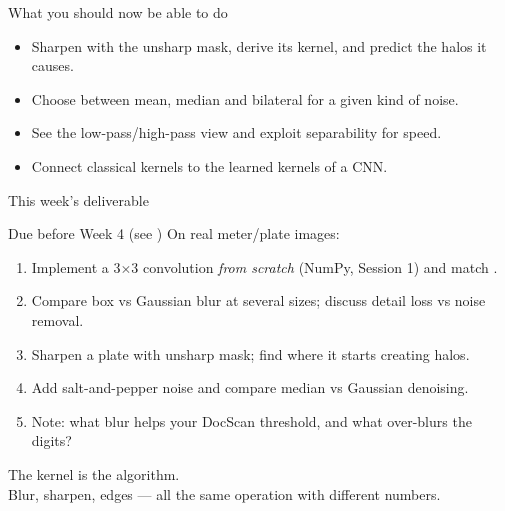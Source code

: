 \documentclass[10pt,aspectratio=169]{beamer}
\begin{document}
\begin{frame}{What you should now be able to do}
  \begin{itemize}
    \item Sharpen with the unsharp mask, derive its kernel, and predict the halos it causes.
    \item Choose between mean, median and bilateral for a given kind of noise.
    \item See the low-pass/high-pass view and exploit separability for speed.
    \item Connect classical kernels to the learned kernels of a CNN.
  \end{itemize}
\end{frame}

\begin{frame}{This week's deliverable}
  \begin{alertblock}{Due before Week 4 (see )}
    On real meter/plate images:
    \begin{enumerate}
      \item Implement a 3$\times$3 convolution \emph{from scratch} (NumPy, Session 1) and match .
      \item Compare box vs Gaussian blur at several sizes; discuss detail loss vs noise removal.
      \item Sharpen a plate with unsharp mask; find where it starts creating halos.
      \item Add salt-and-pepper noise and compare median vs Gaussian denoising.
      \item Note: what blur helps your DocScan threshold, and what over-blurs the digits?
    \end{enumerate}
  \end{alertblock}
\end{frame}

\begin{frame}[standout]
  The kernel is the algorithm.\\[4pt]
  \normalsize Blur, sharpen, edges — all the same operation with different numbers.
\end{frame}
\end{document}
